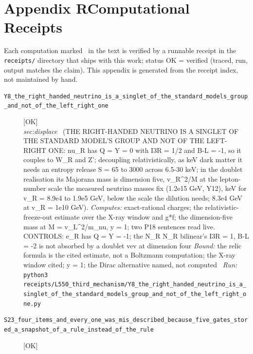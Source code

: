 \clearpage
\section*{Appendix R\quad Computational Receipts}\label{app:receipts}
\small\noindent Each computation marked \rcptmarker\ in the text is verified by a runnable receipt in the \texttt{receipts/} directory that ships with this work; status \textsf{OK} = verified (traced, run, output matches the claim). This appendix is generated from the receipt index, not maintained by hand.\par\medskip
\begingroup\renewcommand{\arraystretch}{1.25}
\begin{description}
\item[\label{rcpt:Y8_the_right_handed_neutrino_is_a_singlet_of_the_standard_models_group_and_not_of_the_left_right_one}\textbf{}\quad\texttt{Y8\_the\_right\_handed\_neutrino\_is\_a\_singlet\_of\_the\_standard\_models\_group\_and\_not\_of\_the\_left\_right\_one}]\hfill\textsf{[OK]}\\
\textit{sec:displace} \ (THE RIGHT-HANDED NEUTRINO IS A SINGLET OF THE STANDARD MODEL'S GROUP AND NOT OF THE LEFT-RIGHT ONE: nu\_R has Q = Y = 0 with I3R = 1/2 and B-L = -1, so it couples to W\_R and Z'; decoupling relativistically, as keV dark matter it needs an entropy release S = 65 to 3000 across 6.5-30 keV; in the doublet realisation its Majorana mass is dimension five, v\_R\textasciicircum{}2/M at the lepton-number scale the measured neutrino masses fix (1.2e15 GeV, Y12), keV for v\_R = 8.9e4 to 1.9e5 GeV, below the scale the dilution needs; 8.3e4 GeV at v\_R = 1e10 GeV). 
\emph{Computes:} exact-rational charges; the relativistic-freeze-out estimate over the X-ray window and g*f; the dimension-five mass at M = v\_L\textasciicircum{}2/m\_nu, y = 1; two P18 sentences read live. CONTROLS: e\_R has Q = Y = -1; the N\_R N\_R bilinear's I3R = 1, B-L = -2 is not absorbed by a doublet vev at dimension four
 \emph{Bound:} the relic formula is the cited estimate, not a Boltzmann computation; the X-ray window cited; y = 1; the Dirac alternative named, not computed
\ \emph{Run:} \texttt{python3 receipts/L550\_third\_mechanism/Y8\_the\_right\_handed\_neutrino\_is\_a\_singlet\_of\_the\_standard\_models\_group\_and\_not\_of\_the\_left\_right\_one.py}
\item[\label{rcpt:S23_four_items_and_every_one_was_mis_described_because_five_gates_stored_a_snapshot_of_a_rule_instead_of_the_rule}\textbf{}\quad\texttt{S23\_four\_items\_and\_every\_one\_was\_mis\_described\_because\_five\_gates\_stored\_a\_snapshot\_of\_a\_rule\_instead\_of\_the\_rule}]\hfill\textsf{[OK]}\\

\end{description}
